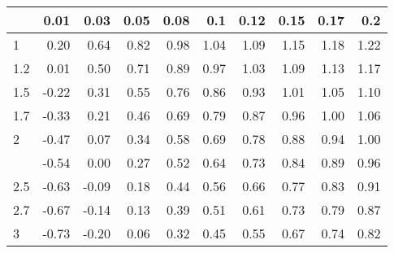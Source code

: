 
\begin{tabular}{lrrrrrrrrr}
\toprule
  & 0.01 & 0.03 & 0.05 & 0.08 & 0.1 & 0.12 & 0.15 & 0.17 & 0.2\\
\midrule
1 & 0.20 & 0.64 & 0.82 & 0.98 & 1.04 & 1.09 & 1.15 & 1.18 & 1.22\\
1.2 & 0.01 & 0.50 & 0.71 & 0.89 & 0.97 & 1.03 & 1.09 & 1.13 & 1.17\\
1.5 & -0.22 & 0.31 & 0.55 & 0.76 & 0.86 & 0.93 & 1.01 & 1.05 & 1.10\\
1.7 & -0.33 & 0.21 & 0.46 & 0.69 & 0.79 & 0.87 & 0.96 & 1.00 & 1.06\\
2 & -0.47 & 0.07 & 0.34 & 0.58 & 0.69 & 0.78 & 0.88 & 0.94 & 1.00\\
\addlinespace
2.2 & -0.54 & 0.00 & 0.27 & 0.52 & 0.64 & 0.73 & 0.84 & 0.89 & 0.96\\
2.5 & -0.63 & -0.09 & 0.18 & 0.44 & 0.56 & 0.66 & 0.77 & 0.83 & 0.91\\
2.7 & -0.67 & -0.14 & 0.13 & 0.39 & 0.51 & 0.61 & 0.73 & 0.79 & 0.87\\
3 & -0.73 & -0.20 & 0.06 & 0.32 & 0.45 & 0.55 & 0.67 & 0.74 & 0.82\\
\bottomrule
\end{tabular}
